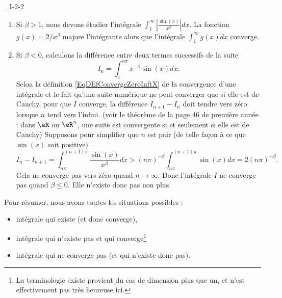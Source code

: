 

\begin{corrige}{_I-2-2}

\begin{enumerate}
\item Si $\beta>1$, nous devons étudier l'intégrale $\int_1^{\infty}\left| \frac{ \sin(x) }{ x^{\beta} }  \right|dx$. La fonction $g(x)=2/x^{\beta}$ majore l'intégrante alors que l'intégrale $\int_1^{\infty}g(x)dx$ converge.

\item Si $\beta<0$, calculons la différence entre deux termes successifs de la suite
\begin{equation}		\label{EqInACaclDiff}
	I_n=\int_1^{n\pi}x^{-\beta}\sin(x)dx.
\end{equation}
Selon la définition \eqref{EqDEfConvergeZeroInftX} de la convergence d'une intégrale et le fait qu'une suite numérique ne peut converger que si elle est de Cauchy, pour que $I$ converge, la différence $I_{n+1}-I_n$ doit tendre vers zéro lorsque $n$ tend vers l'infini. (voir le théorème de la page 46 de première année : dans $\eR$ ou $\eR^n$, une suite est convergente si et seulement si elle est de Cauchy) Supposons pour simplifier que $n$ est pair (de telle façon à ce que $\sin(x)$ soit positive)
\begin{equation}
	I_n-I_{n+1}=\int_{n\pi}^{(n+1)\pi}\frac{ \sin(x) }{ x^{\beta} }dx>(n\pi)^{-\beta}\int_{n\pi}^{(n+1)\pi}\sin(x)dx=2(n\pi)^{-\beta}.
\end{equation}
Cela ne converge pas vers zéro quand $n\to\infty$. Donc l'intégrale $I$ ne converge pas quand $\beta\leq 0$. Elle n'existe donc pas non plus.


\end{enumerate}
Pour résumer, nous avons toutes les situations possibles :
\begin{itemize}
\item intégrale qui existe (et donc converge),
\item intégrale qui n'existe pas et qui converge\footnote{La terminologie \og existe\fg{} provient du cas de dimension plus que un, et n'est effectivement pas très heureuse ici.}
\item intégrale qui ne converge pas (et qui n'existe donc pas).
\end{itemize}

\end{corrige}
